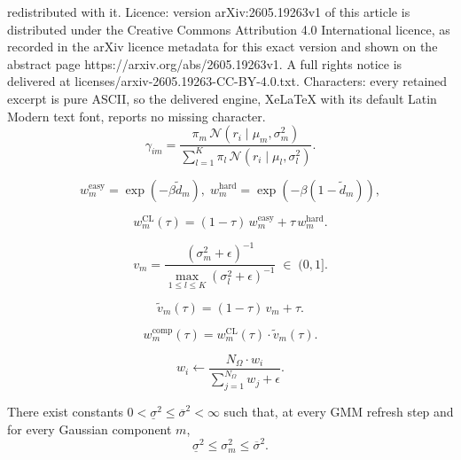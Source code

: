 \documentclass[10pt,a4paper]{amsart}
\begin{document}
redistributed with it. Licence: version arXiv:2605.19263v1 of this article is distributed under the Creative Commons Attribution 4.0 International licence, as recorded in the arXiv licence metadata for this exact version and shown on the abstract page https://arxiv.org/abs/2605.19263v1. A full rights notice is delivered at licenses/arxiv-2605.19263-CC-BY-4.0.txt. Characters: every retained excerpt is pure ASCII, so the delivered engine, XeLaTeX with its default Latin Modern text font, reports no missing character.
	\begin{equation}
		\gamma_{im}
		= \frac{\pi_m\,\mathcal{N}(r_i\mid\mu_m,\sigma_m^2)}
		{\sum_{l=1}^{K}\pi_l\,
			\mathcal{N}(r_i\mid\mu_l,\sigma_l^2)}.
		\label{eq:gmm_posterior}
	\end{equation}

	\begin{equation}
		w_m^{\mathrm{easy}} = \exp(-\beta\tilde{d}_m),\;
		w_m^{\mathrm{hard}} = \exp(-\beta(1 - \tilde{d}_m)),
		\label{eq:easy_hard_weights}
	\end{equation}

	\begin{equation}
		w_m^{\mathrm{CL}}(\tau)
		= (1-\tau)\,w_m^{\mathrm{easy}}
		+ \tau\,w_m^{\mathrm{hard}}.
		\label{eq:curriculum_weight}
	\end{equation}

	\begin{equation}
		v_m
		= \frac{(\sigma_m^2+\epsilon)^{-1}}
		{\max_{1\leqslant l\leqslant K}(\sigma_l^2+\epsilon)^{-1}}
		\;\in\;(0,1].
		\label{eq:precision_factor}
	\end{equation}

	\begin{equation}
		\tilde{v}_m(\tau) = (1-\tau)\,v_m + \tau.
		\label{eq:effective_precision}
	\end{equation}

	\begin{equation}
		w_m^{\mathrm{comp}}(\tau)
		= w_m^{\mathrm{CL}}(\tau)\cdot\tilde{v}_m(\tau).
		\label{eq:combined_weight}
	\end{equation}

	\begin{equation}
		w_i \leftarrow
		\frac{N_\Omega\cdot w_i}
		{\sum_{j=1}^{N_\Omega}w_j + \epsilon}.
		\label{eq:weight_normalize}
	\end{equation}

\begin{assumption}
	\label{ass:bounded_variances}
	There exist constants
	$0<\underline{\sigma}^{2}\leqslant \overline{\sigma}^{2}<\infty$
	such that, at every GMM refresh step and for every Gaussian component
	$m$,
	\begin{equation}
		\underline{\sigma}^{2}
		\leqslant
		\sigma_m^{2}
		\leqslant
		\overline{\sigma}^{2}.
		\label{eq:app_variance_bound}
	\end{equation}
\end{assumption}
\end{document}
